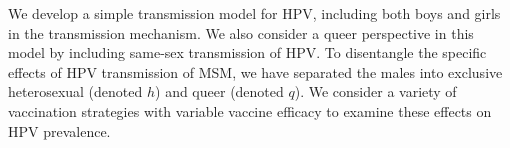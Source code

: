 \documentclass[12pt]{article}
\begin{document}
We develop a simple transmission model for HPV, including both boys and girls in the transmission mechanism.  We also consider a queer perspective in this model by including same-sex transmission of HPV.  To disentangle the specific effects of HPV transmission of MSM, we have separated the males into exclusive heterosexual (denoted $h$) and queer (denoted $q$).  We consider a variety of vaccination strategies with variable vaccine efficacy to examine these effects on HPV prevalence.  
%
%
%
%
\end{document}
